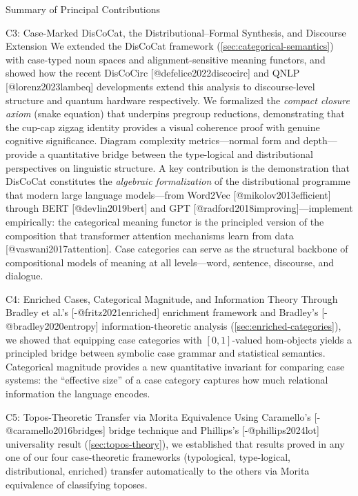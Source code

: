 \documentclass[
  ignorenonframetext,
]{beamer}
\begin{document}
\begin{frame}{Summary of Principal Contributions}
\begin{block}{C3: Case-Marked DisCoCat, the Distributional--Formal
Synthesis, and Discourse Extension}
\protect{}\label{c3-case-marked-discocat-the-distributionalformal-synthesis-and-discourse-extension}
We extended the DisCoCat framework (\autoref{sec:categorical-semantics})
with case-typed noun spaces and alignment-sensitive meaning functors,
and showed how the recent DisCoCirc {[}@defelice2022discocirc{]} and
QNLP {[}@lorenz2023lambeq{]} developments extend this analysis to
discourse-level structure and quantum hardware respectively. We
formalized the \emph{compact closure axiom} (snake equation) that
underpins pregroup reductions, demonstrating that the cup-cap zigzag
identity provides a visual coherence proof with genuine cognitive
significance. Diagram complexity metrics---normal form and
depth---provide a quantitative bridge between the type-logical and
distributional perspectives on linguistic structure. A key contribution
is the demonstration that DisCoCat constitutes the \emph{algebraic
formalization} of the distributional programme that modern large
language models---from Word2Vec {[}@mikolov2013efficient{]} through BERT
{[}@devlin2019bert{]} and GPT {[}@radford2018improving{]}---implement
empirically: the categorical meaning functor is the principled version
of the composition that transformer attention mechanisms learn from data
{[}@vaswani2017attention{]}. Case categories can serve as the structural
backbone of compositional models of meaning at all levels---word,
sentence, discourse, and dialogue.
\end{block}

\begin{block}{C4: Enriched Cases, Categorical Magnitude, and Information
Theory}
\protect{}\label{c4-enriched-cases-categorical-magnitude-and-information-theory}
Through Bradley et al.'s {[}-@fritz2021enriched{]} enrichment framework
and Bradley's {[}-@bradley2020entropy{]} information-theoretic analysis
(\autoref{sec:enriched-categories}), we showed that equipping case
categories with \([0,1]\)-valued hom-objects yields a principled bridge
between symbolic case grammar and statistical semantics. Categorical
magnitude provides a new quantitative invariant for comparing case
systems: the ``effective size'' of a case category captures how much
relational information the language encodes.
\end{block}

\begin{block}{C5: Topos-Theoretic Transfer via Morita Equivalence}
\protect{}\label{c5-topos-theoretic-transfer-via-morita-equivalence}
Using Caramello's {[}-@caramello2016bridges{]} bridge technique and
Phillips's {[}-@phillips2024lot{]} universality result
(\autoref{sec:topos-theory}), we established that results proved in any
one of our four case-theoretic frameworks (typological, type-logical,
distributional, enriched) transfer automatically to the others via
Morita equivalence of classifying toposes.
\end{block}


\end{frame}
\end{document}
